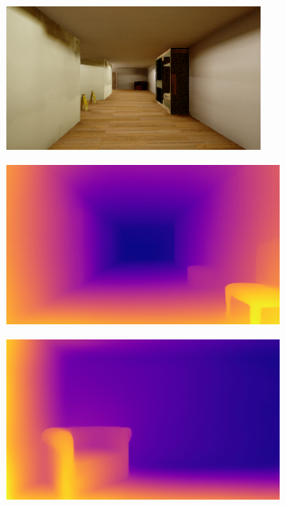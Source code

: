 \begin{figure}[H]
\begin{subfigure}{0.32\textwidth}
        \vspace{0.5em}
    \end{subfigure}
    \hfill
    \begin{subfigure}{0.32\textwidth}
        \centering
        \includegraphics[width=\textwidth]{resources/png/06/depth/original/2.png}
        \vspace{0.5em}
    \end{subfigure}
    \begin{subfigure}{0.32\textwidth}
        \centering
        \includegraphics[width=\textwidth]{resources/png/06/depth/results/0.png}
    \end{subfigure}
    \hfill
    \begin{subfigure}{0.32\textwidth}
        \centering
        \includegraphics[width=\textwidth]{resources/png/06/depth/results/1.png}

\end{subfigure}
\end{figure}
